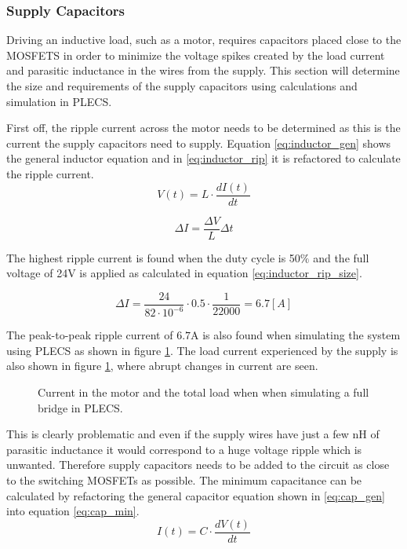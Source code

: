 \subsubsection{Supply Capacitors}
\label{ssub:sup_caps}
Driving an inductive load, such as a motor, requires capacitors placed close to the MOSFETS in order to minimize the voltage spikes created by the load current and parasitic inductance in the wires from the supply.
This section will determine the size and requirements of the supply capacitors using calculations and simulation in PLECS.

First off, the ripple current across the motor needs to be determined as this is the current the supply capacitors need to supply.
Equation \ref{eq:inductor_gen} shows the general inductor equation and in \ref{eq:inductor_rip} it is refactored to calculate the ripple current.
\begin{equation}
	V(t) = L \cdot \frac{dI(t)}{dt}
	\label{eq:inductor_gen}
\end{equation}

\begin{equation}
	\Delta I = \frac{\Delta V}{L} \Delta t
	\label{eq:inductor_rip}
\end{equation}

The highest ripple current is found when the duty cycle is 50$\%$ and the full voltage of 24V is applied as calculated in equation \ref{eq:inductor_rip_size}.

\begin{equation}
	\Delta I = \frac{24}{82\cdot 10^{-6}} \cdot 0.5 \cdot \frac{1}{22000} = 6.7 [A] 
	\label{eq:inductor_rip_size}
\end{equation}

The peak-to-peak ripple current of $6.7$A is also found when simulating the system using PLECS as shown in figure \ref{fig:sim_currents}.
The load current experienced by the supply is also shown in figure \ref{fig:sim_currents}, where abrupt changes in current are seen. 

\begin{figure}[h]
	\centering
	\caption[Simulating motor and load currents in Plecs.]{Current in the motor and the total load when when simulating a full bridge in PLECS.}
	\label{fig:sim_currents}
\end{figure}

This is clearly problematic and even if the supply wires have just a few nH of parasitic inductance it would correspond to a huge voltage ripple which is unwanted. 
Therefore supply capacitors needs to be added to the circuit as close to the switching MOSFETs as possible.
The minimum capacitance can be calculated by refactoring the general capacitor equation shown in \ref{eq:cap_gen} into equation \ref{eq:cap_min}.
\begin{equation} 
	I(t) = C \cdot \frac{dV(t)}{dt}
	\label{eq:cap_gen}
\end{equation}

